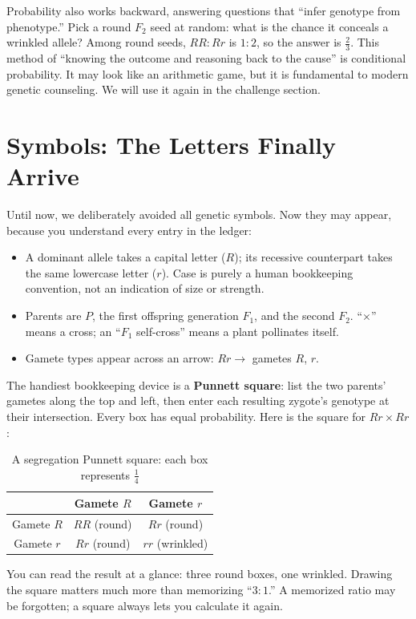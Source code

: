 Probability also works backward, answering questions that ``infer genotype from phenotype.'' Pick a round $F_2$ seed at random: what is the chance it conceals a wrinkled allele? Among round seeds, $RR:Rr$ is $1:2$, so the answer is $\frac{2}{3}$. This method of ``knowing the outcome and reasoning back to the cause'' is conditional probability. It may look like an arithmetic game, but it is fundamental to modern genetic counseling. We will use it again in the challenge section.

\section{Symbols: The Letters Finally Arrive}

Until now, we deliberately avoided all genetic symbols. Now they may appear, because you understand every entry in the ledger:

\begin{itemize}[itemsep=2pt]
\item A dominant allele takes a capital letter ($R$); its recessive counterpart takes the same lowercase letter ($r$). Case is purely a human bookkeeping convention, not an indication of size or strength.
\item Parents are $P$, the first offspring generation $F_1$, and the second $F_2$. ``$\times$'' means a cross; an ``$F_1$ self-cross'' means a plant pollinates itself.
\item Gamete types appear across an arrow: $Rr \rightarrow$ gametes $R$, $r$.
\end{itemize}

The handiest bookkeeping device is a \textbf{Punnett square}: list the two parents' gametes along the top and left, then enter each resulting zygote's genotype at their intersection. Every box has equal probability. Here is the square for $Rr \times Rr$:

\begin{table}[htbp]
\centering
\caption{A segregation Punnett square: each box represents $\frac{1}{4}$}
\begin{tabular}{c|cc}
\toprule
 & Gamete $R$ & Gamete $r$ \\
\midrule
Gamete $R$ & $RR$ (round) & $Rr$ (round) \\
Gamete $r$ & $Rr$ (round) & $rr$ (wrinkled) \\
\bottomrule
\end{tabular}
\end{table}

You can read the result at a glance: three round boxes, one wrinkled. Drawing the square matters much more than memorizing ``$3:1$.'' A memorized ratio may be forgotten; a square always lets you calculate it again.

